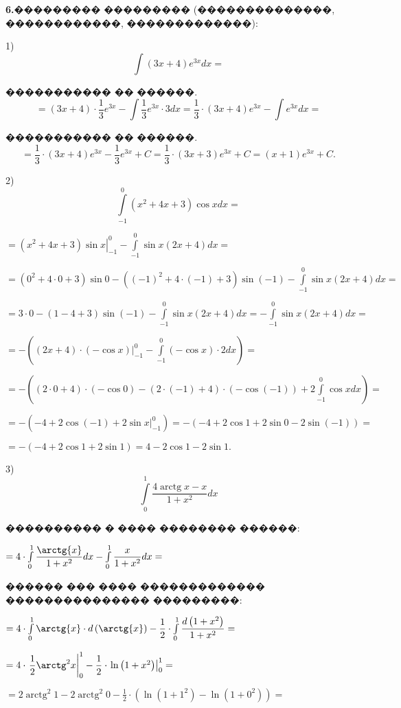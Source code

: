\documentclass{article}
\begin{document}
\textbf{6.}��������� ��������� (��������������, ������������, �������������):

1)$$\int (3x+4)e^{3x}dx = $$

����������� �� ������.
$$ = (3x+4)\cdot \frac{1}{3}e^{3x} - \int \frac{1}{3}e^{3x}\cdot 3dx = \frac{1}{3}\cdot (3x+4)e^{3x} - \int e^{3x}dx =$$

����������� �� ������.
$$ = \frac{1}{3}\cdot (3x+4)e^{3x} - \frac{1}{3}e^{3x} + C = \frac{1}{3}\cdot (3x+3)e^{3x} + C= (x+1)e^{3x} + C .$$

2)$$\int\limits_{-1}^0 \left(x^2+4x+3\right)\cos{x} dx = $$

$ = \left.\left(x^2+4x+3\right)\sin{x}\right|_{-1}^0 - \int\limits_{-1}^0 \sin{x}(2x+4)dx = $

$= \left(0^2+4\cdot 0+3\right)\sin{0} - \left((-1)^2+4\cdot (-1)+3\right)\sin{(-1)} - \int\limits_{-1}^0 \sin{x}(2x+4)dx = $

$= 3\cdot 0 - (1-4+3)\sin{(-1)} - \int\limits_{-1}^0 \sin{x}(2x+4)dx = - \int\limits_{-1}^0 \sin{x}(2x+4)dx =$

$= -\left( \left.(2x+4)\cdot \left( -\cos{x}\right)\right|_{-1}^0 - \int\limits_{-1}^0 \left(-\cos{x}\right)\cdot 2dx \right)=$

$ = -\left( (2\cdot 0+4)\cdot \left( -\cos{0}\right) - (2\cdot (-1)+4)\cdot \left( -\cos{(-1)}\right) + 2\int\limits_{-1}^0 \cos{x}dx \right)=$

$ = -\left( -4 + 2\cos{(-1)} + \left. 2\sin{x} \right|_{-1}^0\right) = -\left( -4 + 2\cos{1} + 2\sin{0} - 2\sin{(-1)} \right)=$

$= -\left( -4 + 2\cos{1} + 2\sin{1} \right) = 4 - 2\cos{1} - 2\sin{1}.$

3)
$$\int\limits_0^1 \dfrac{4\operatorname{arctg}{x}-x}{1+x^2} dx$$ 

���������� � ���� �������� ������:

$= 4\cdot \int\limits_0^1 \dfrac{\arctg{x}}{1+x^2} dx - \int\limits_0^1 \dfrac{x}{1+x^2} dx = $

������ ��� ���� ������������� ��������������� ���������:

$= 4\cdot \int\limits_0^1 \arctg{x}\cdot  d\left(\arctg{x}\right) - \dfrac{1}{2}\cdot \int\limits_0^1 \dfrac{d\left(1+x^2\right)}{1+x^2}  =$

$ = 4\cdot \left. \dfrac{1}{2}\arctg^{2}{x}\right|_0^1 - \dfrac{1}{2}\cdot \left.\ln{\left(1+x^2\right)}\right|_0^1 = $

$ = 2\operatorname{arctg}^{2}{1}-2\operatorname{arctg}^{2}{0} - \frac{1}{2}\cdot\left(\ln{\left(1+1^2\right)}-\ln{\left(1+0^2\right)}\right) =$
\end{document}
